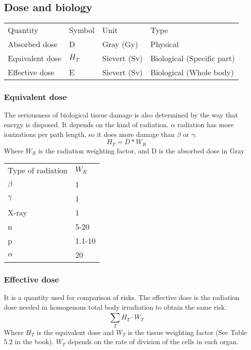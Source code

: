 \subsection{Dose and biology}
\begin{table}[]
\begin{tabular}{llll}
Quantity        & Symbol & Unit         & Type       \\
Absorbed dose   & D      & Gray (Gy)    & Physical   \\
Equivalent dose & $H_T$    & Sievert (Sv) & Biological (Specific part) \\
Effective dose  & E      & Sievert (Sv) & Biological (Whole body)
\end{tabular}
\end{table}

\subsubsection{Equivalent dose}
The seriousness of biological tissue damage is also determined by the way that energy is disposed. It depends on the kind of radiation. $\alpha$ radiation has more ionizations per path length, so it does more damage than $\beta$ or $\gamma$.
\[ H_T = D * W_R\]
Where $W_R$ is the radiation weighting factor, and D is the absorbed dose in Gray

\begin{table}[]
\begin{tabular}{ll}
Type of radiation & $W_R$    \\
$\beta$             & 1      \\
$\gamma$            & 1      \\
X-ray             & 1      \\
n                 & 5-20   \\
p                 & 1.1-10 \\
$\alpha$            & 20    
\end{tabular}
\end{table}

\subsubsection{Effective dose}
It is a quantity used for comparison of risks. The effective dose is the radiation dose needed in homogenous total body irradiation to obtain the same risk.
\[ \sum_{T}^{}H_T\cdot W_T \]
Where $H_T$ is the equivalent dose and $W_T$ is the tissue weighting factor (See Table 5.2 in the book). $W_T$ depends on the rate of division of the cells in each organ.

